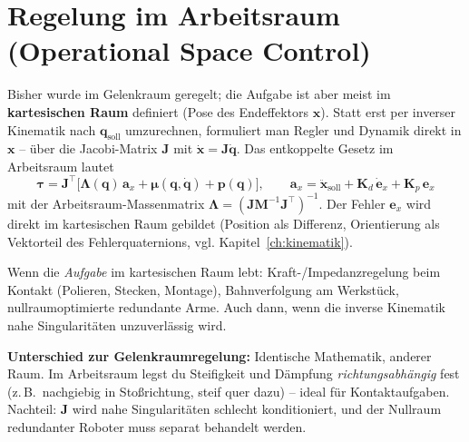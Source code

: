 \section{Regelung im Arbeitsraum (Operational Space Control)}
Bisher wurde im Gelenkraum geregelt; die Aufgabe ist aber meist im
\textbf{kartesischen Raum} definiert (Pose des Endeffektors $\bm{x}$). Statt erst
per inverser Kinematik nach $\bm{q}_{\text{soll}}$ umzurechnen, formuliert man
Regler und Dynamik direkt in $\bm{x}$ -- über die Jacobi-Matrix $\bm{J}$ mit
$\dot{\bm{x}} = \bm{J}\dot{\bm{q}}$. Das entkoppelte Gesetz im Arbeitsraum lautet
\begin{equation}
\bm{\tau} = \bm{J}^\top\!\Big[\bm{\Lambda}(\bm{q})\,\bm{a}_x
+ \bm{\mu}(\bm{q},\dot{\bm{q}}) + \bm{p}(\bm{q})\Big],
\qquad
\bm{a}_x = \ddot{\bm{x}}_{\text{soll}}
+ \bm{K}_d\,\dot{\bm{e}}_x + \bm{K}_p\,\bm{e}_x
\end{equation}
mit der Arbeitsraum-Massenmatrix $\bm{\Lambda} = (\bm{J}\bm{M}^{-1}\bm{J}^\top)^{-1}$.
Der Fehler $\bm{e}_x$ wird direkt im kartesischen Raum gebildet (Position als
Differenz, Orientierung als Vektorteil des Fehlerquaternions, vgl.
Kapitel~\ref{ch:kinematik}).
\begin{infobox}[title=Wann einsetzen]
Wenn die \emph{Aufgabe} im kartesischen Raum lebt: Kraft-/Impedanz\-regelung beim
Kontakt (Polieren, Stecken, Montage), Bahnverfolgung am Werkstück,
nullraumoptimierte redundante Arme. Auch dann, wenn die inverse Kinematik nahe
Singularitäten unzuverlässig wird.
\end{infobox}
\textbf{Unterschied zur Gelenkraumregelung:} Identische Mathematik, anderer Raum.
Im Arbeitsraum legst du Steifigkeit und Dämpfung \emph{richtungsabhängig} fest
(z.\,B.\ nachgiebig in Stoßrichtung, steif quer dazu) -- ideal für Kontakt\-aufgaben.
Nachteil: $\bm{J}$ wird nahe Singularitäten schlecht konditioniert, und der
Nullraum redundanter Roboter muss separat behandelt werden.


